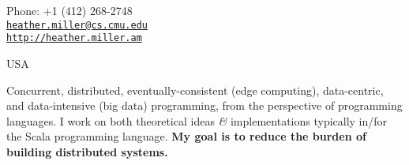 \documentclass[9pt]{article}
\makeatletter
\def\myemail{heather.miller@cs.cmu.edu}
\def\myweb{http://heather.miller.am}
\def\myphone{+1 (412) 268-2748}
\makeatother
\begin{document}
\begin{minipage}[t]{2.95in}

\end{minipage}
\hfill
\hfill
\begin{minipage}[t]{1.7in}
  \flushright \footnotesize Phone: \myphone \\
  {\scriptsize  \texttt{\href{mailto:\myemail}{\myemail}}} \\
  {\scriptsize  \vspace{-0.03in} \texttt{\href{\myweb}{\myweb}}}
\end{minipage}


\medskip

\reversemarginpar

\medskip
\bigskip


 \noindent USA

 \medskip

\textheight=580pt

\noindent Concurrent, distributed, eventually-consistent (edge computing), data-centric, and data-intensive (big data) programming, from the perspective of programming languages. I work on both theoretical ideas {\em \&} implementations typically in/for the Scala programming language. {\bf My goal is to reduce the burden of building distributed systems.}
\bigskip
\medskip
\end{document}
